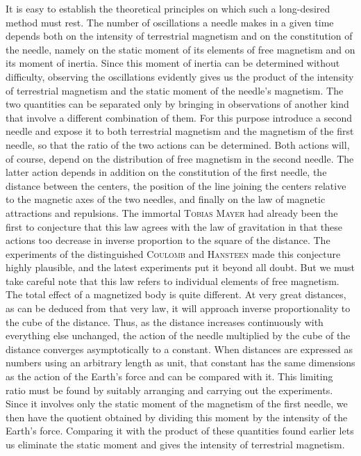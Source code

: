 It is easy to establish the theoretical principles on which such a long-desired method must rest. The number of oscillations a needle makes in a given time depends both on the intensity of terrestrial magnetism and on the constitution of the needle, namely on the static moment of its elements of free magnetism and on its moment of inertia. Since this moment of inertia can be determined without difficulty, observing the oscillations evidently gives us the product of the intensity of terrestrial magnetism and the static moment of the needle's magnetism. The two quantities can be separated only by bringing in observations of another kind that involve a different combination of them. For this purpose introduce a second needle and expose it to both terrestrial magnetism and the magnetism of the first needle, so that the ratio of the two actions can be determined. Both actions will, of course, depend on the distribution of free magnetism in the second needle. The latter action depends in addition on the constitution of the first needle, the distance between the centers, the position of the line joining the centers relative to the magnetic axes of the two needles, and finally on the law of magnetic attractions and repulsions. The immortal \textsc{Tobias Mayer} had already been the first to conjecture that this law agrees with the law of gravitation in that these actions too decrease in inverse proportion to the square of the distance. The experiments of the distinguished \textsc{Coulomb} and \textsc{Hansteen} made this conjecture highly plausible, and the latest experiments put it beyond all doubt. But we must take careful note that this law refers to individual elements of free magnetism. The total effect of a magnetized body is quite different. At very great distances, as can be deduced from that very law, it will approach inverse proportionality to the cube of the distance. Thus, as the distance increases continuously with everything else unchanged, the action of the needle multiplied by the cube of the distance converges asymptotically to a constant. When distances are expressed as numbers using an arbitrary length as unit, that constant has the same dimensions as the action of the Earth's force and can be compared with it. This limiting ratio must be found by suitably arranging and carrying out the experiments. Since it involves only the static moment of the magnetism of the first needle, we then have the quotient obtained by dividing this moment by the intensity of the Earth's force. Comparing it with the product of these quantities found earlier lets us eliminate the static moment and gives the intensity of terrestrial magnetism.

